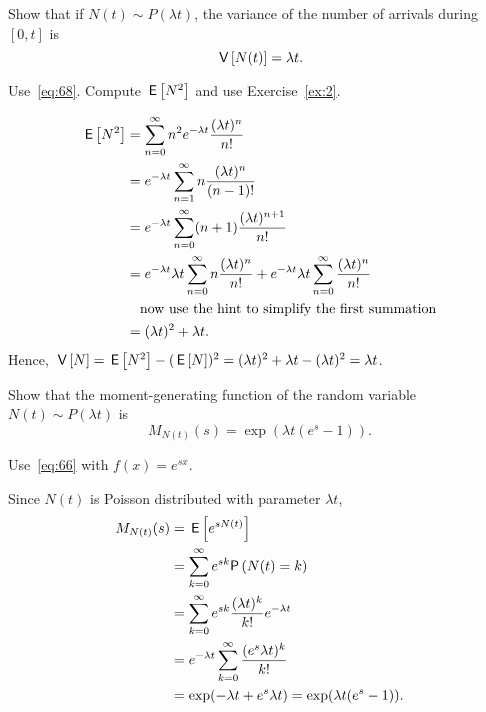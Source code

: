 \begin{extra}
  Show that if $N(t)\sim P(\lambda t)$, the variance of the number of arrivals during $[0,t]$ is
  \begin{equation*}
\,\mathsf{V}\left[N(t)\right] = \lambda t.
  \end{equation*}
  \begin{hint} Use~\eqref{eq:68}. Compute $\,\mathsf{E}\left[N^2\right]$ and use Exercise~\ref{ex:2}.
  \end{hint}
  \begin{solution} 

    \begin{align*}
      \,\mathsf{E}\left[N^2\right]
&= \sum_{n=0}^\infty n^2 e^{-\lambda t}\frac{(\lambda t)^n}{n!}  \\
&= e^{-\lambda t} \sum_{n=1}^\infty n \frac{(\lambda t)^n}{(n-1)!}  \\
&= e^{-\lambda t} \sum_{n=0}^\infty (n+1) \frac{(\lambda t)^{n+1}}{n!}  \\
&= e^{-\lambda t} \lambda t \sum_{n=0}^\infty n \frac{(\lambda t)^{n}}{n!}  +e^{-\lambda t}\lambda t \sum_{n=0}^\infty\frac{(\lambda t)^{n}}{n!}  \\
&\quad\text{now use the hint to simplify the first summation} \\
&= (\lambda t)^2  + \lambda t.
\end{align*}
Hence, $\,\mathsf{V}\left[N\right] = \,\mathsf{E}\left[N^2\right] - (\,\mathsf{E}\left[N\right])^2 = (\lambda t)^2 + \lambda t - (\lambda t)^2 = \lambda t$.
\end{solution}
\end{extra}

\begin{extra}\label{ex:53}
Show that the moment-generating function of the random variable~$N(t)\sim P(\lambda t)$ is
\begin{equation*}
M_{N(t)}(s) 
= \exp{(\lambda t(e^s-1))}.
\end{equation*}
\begin{hint}
Use~\eqref{eq:66} with $f(x) = e^{sx}$.  \end{hint}
\begin{solution}
Since $N(t)$ is Poisson distributed with parameter $\lambda t$, 
\begin{align*}
M_{N(t)}(s)
&=  \E{e^{s N(t)}} \\
&= \sum_{k=0}^\infty e^{s k} \P{N(t)=k} \\
&= \sum_{k=0}^\infty e^{s k} \frac{(\lambda t)^k}{k!} e^{-\lambda t}  \\
&= e^{-\lambda t} \sum_{k=0}^\infty  \frac{(e^s \lambda t)^k}{k!}  \\
&= \exp(-\lambda t + e^s \lambda t) =\exp(\lambda t(e^s - 1)).
\end{align*}
\end{solution}
\end{extra}

